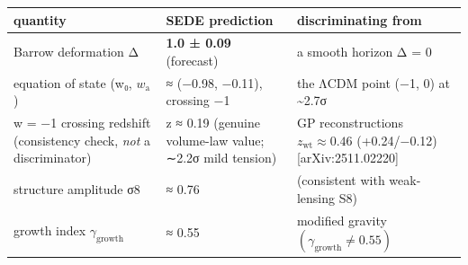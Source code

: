 \documentclass[
  10pt,
]{article}
\begin{document}
\begin{longtable}[]{@{}
  >{\raggedright\arraybackslash}p{}
  >{\raggedright\arraybackslash}p{}
  >{\raggedright\arraybackslash}p{}@{}}
\toprule\noalign{}
\begin{minipage}[b]{\linewidth}\raggedright
quantity
\end{minipage} & \begin{minipage}[b]{\linewidth}\raggedright
SEDE prediction
\end{minipage} & \begin{minipage}[b]{\linewidth}\raggedright
discriminating from
\end{minipage} \\
\midrule\noalign{}
\endhead
\bottomrule\noalign{}
\endlastfoot
Barrow deformation Δ & \textbf{1.0 ± 0.09} (forecast) & a smooth horizon
Δ = 0 \\
equation of state (w₀, \(w_{\mathrm{a}}\)) & ≈ (−0.98, −0.11), crossing
−1 & the ΛCDM point (−1, 0) at \textasciitilde2.7σ \\
w = −1 crossing redshift (consistency check, \emph{not} a discriminator)
& z ≈ 0.19 (genuine volume-law value; ∼2.2σ mild tension) & GP
reconstructions \(z_{\mathrm{wt}} \approx  0.46\) (+0.24/−0.12)
{[}arXiv:2511.02220{]} \\
structure amplitude σ8 & ≈ 0.76 & (consistent with weak-lensing S8) \\
growth index \(\gamma _{\mathrm{growth}}\) & ≈ 0.55 & modified gravity
\((\gamma _{\mathrm{growth}} \neq  0.55)\) \\
\end{longtable}
\end{document}
